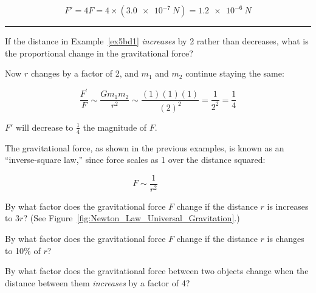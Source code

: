 \documentclass[main.tex]{subfiles}
\begin{document}
\begin{equation*}
    F' = 4 F = 4 \times  \left(\SI{3.0e-7}{N}\right) = \SI{1.2e-6}{N}
\end{equation*}


\vspace{1em}
\hrule

\begin{example}
If the distance in Example~\ref{ex5bd1} \textit{increases} by 2 rather than decreases, what is the proportional change in the gravitational force?
\end{example} 

\Solution Now $r$ changes by a factor of 2, and $m_1$ and $m_2$ continue staying the same:

\begin{equation*}
    \frac{F^{\prime}}{F} \sim \frac{G m_1 m_2}{r^2} \sim \frac{(1)(1)(1)}{(2)^2} = \frac{1}{2^2} =\frac{1}{4}
\end{equation*}

$F'$ will decrease to $\frac{1}{4}$ the magnitude of $F$.

\vspace{1ex}
\cyanhrule
\vspace{1ex}

The gravitational force, as shown in the previous examples, is known as an ``inverse-square law,'' since force scales as 1 over the distance squared:

\begin{equation*} \tag{inverse-square law}
    F \sim \frac{1}{r^2} \hspace{3em}
\end{equation*}

\begin{exercise} \label{WhkfQ4}
By what factor does the gravitational force $F$ change if the distance $r$ is increases to $3r$? (See Figure~\ref{fig:Newton_Law_Universal_Gravitation}.) 
\end{exercise}

\begin{exercise} \label{CqOs7y}
By what factor does the gravitational force $F$ change if the distance $r$ is changes to 10\% of $r$? 
\end{exercise}

\begin{exercise} \label{PwaIbN}
By what factor does the gravitational force between two objects change when the distance between them \textit{increases} by a factor of 4?
\end{exercise}
\end{document}
